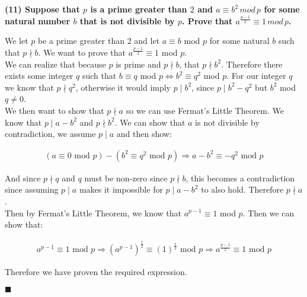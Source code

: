 \documentclass[20pt]{article}
\begin{document}
\noindent
\textbf{(11) Suppose that $p$ is a prime greater than $2$ and $a \equiv b^2 \, mod \,p$ for some natural number $b$ that is not divisible by $p$. Prove that $a^{\frac{p-1}{2}} \equiv 1 \, mod \, p$.}\\
\begin{text}
    We let $p$ be a prime greater than 2 and let $a \equiv b$ mod $p$ for some natural $b$ such that $p \nmid b$. We want to prove that $a^{\frac{p-1}{2}} \equiv 1$ mod $p$.\\
    
    \noindent
    We can realize that because $p$ is prime and $p \nmid b$, that $p \nmid b^2$. Therefore there exists some integer $q$ such that $b \equiv q$ mod $p \iff b^2 \equiv q^2$ mod $p$. For our integer $q$ we know that $p \nmid q^2$, otherwise it would imply $p \mid b^2$, since $p \mid b^2 - q^2$ but $b^2$ mod $q \neq 0$.\\
    
    \noindent
    We then want to show that $p \nmid a$ so we can use Fermat's Little Theorem. We know that $p \mid a - b^2$ and $p \nmid b^2$. We can show that $a$ is not divisible by contradiction, we assume $p \mid a$ and then show:
    
    \begin{align}
        (a \equiv 0 \text{ mod } p) - (b^2 \equiv q^2 \text{ mod } p) \Longrightarrow a - b^2 \equiv -q^2 \text{ mod } p \nonumber
    \end{align}
    
    \noindent
    And since $p \nmid q$ and $q$ must be non-zero since $p \nmid b$, this becomes a contradiction since assuming $p \mid a$ makes it impossible for $p \mid a - b^2$ to also hold. Therefore $p \nmid a$.\\
    
    \noindent
    Then by Fermat's Little Theorem, we know that $a^{p-1} \equiv 1$ mod $p$. Then we can show that:
    
    \begin{align}
        a^{p - 1} \equiv 1 \text{ mod } p \Longrightarrow (a^{p - 1})^{\frac{1}{2}} \equiv (1)^{\frac{1}{2}} \text{ mod } p \Longrightarrow a^{\frac{p - 1}{2}} \equiv 1 \text{ mod } p\nonumber
    \end{align}
    
    \noindent
    Therefore we have proven the required expression.
    
    \hfill $\blacksquare$
\end{text}\\
\end{document}
